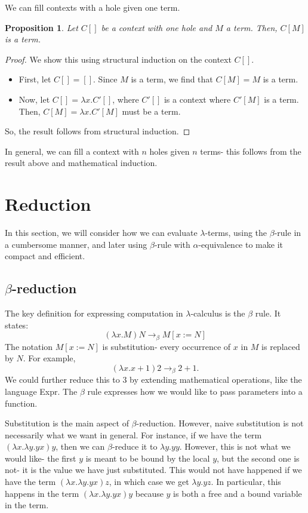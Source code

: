 \documentclass[a4paper, openany]{memoir}
\newtheorem{proposition}{Proposition}[section]
\theoremstyle{definition}
\begin{document}
    We can fill contexts with a hole given one term.
    \begin{proposition}
        Let $C[]$ be a context with one hole and $M$ a term. Then, $C[M]$ is a term.
    \end{proposition}
    \begin{proof}
        We show this using structural induction on the context $C[]$.
        \begin{itemize}
            \item First, let $C[] = []$. Since $M$ is a term, we find that $C[M] = M$ is a term.
            \item Now, let $C[] = \lambda x. C'[]$, where $C'[]$ is a context where $C'[M]$ is a term. Then, $C[M] = \lambda x. C'[M]$ must be a term.
        \end{itemize}
        So, the result follows from structural induction.
    \end{proof}
    \noindent In general, we can fill a context with $n$ holes given $n$ terms- this follows from the result above and mathematical induction.

    \newpage

    \section{Reduction}
    In this section, we will consider how we can evaluate $\lambda$-terms, using the $\beta$-rule in a cumbersome manner, and later using $\beta$-rule with $\alpha$-equivalence to make it compact and efficient.

    \subsection{$\beta$-reduction}
    The key definition for expressing computation in $\lambda$-calculus is the $\beta$ rule. It states:
    \[(\lambda x. M) N \to_\beta M[x := N]\]
    The notation $M[x := N]$ is substitution- every occurrence of $x$ in $M$ is replaced by $N$. For example,
    \[(\lambda x. x+1) 2 \to_\beta 2 + 1.\]
    We could further reduce this to $3$ by extending mathematical operations, like the language Expr. The $\beta$ rule expresses how we would like to pass parameters into a function.

    Substitution is the main aspect of $\beta$-reduction. However, naive substitution is not necessarily what we want in general. For instance, if we have the term $(\lambda x.\lambda y.yx) y$, then we can $\beta$-reduce it to $\lambda y. yy$. However, this is not what we would like- the first $y$ is meant to be bound by the local $y$, but the second one is not- it is the value we have just substituted. This would not have happened if we have the term $(\lambda x. \lambda y. yx)z$, in which case we get $\lambda y.yz$. In particular, this happens in the term $(\lambda x. \lambda y. yx)y$ because $y$ is both a free and a bound variable in the term.
\end{document}
